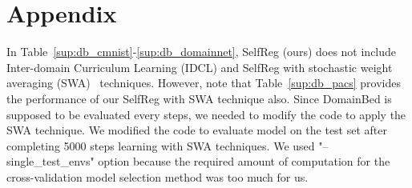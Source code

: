 \documentclass[10pt,twocolumn,letterpaper]{article}
\begin{document}
{


}
\newpage


\section*{Appendix}
In Table~\ref{sup:db_cmnist}-\ref{sup:db_domainnet}, SelfReg (ours) does not include Inter-domain Curriculum Learning (IDCL) and SelfReg with stochastic weight averaging (SWA)~\cite{izmailov2018averaging} techniques. However, note that Table~\ref{sup:db_pacs} provides the performance of our SelfReg with SWA technique also. Since DomainBed is supposed to be evaluated every  steps, we needed to modify the code to apply the SWA technique. We modified the code to evaluate model on the test set after completing 5000 steps learning with SWA techniques. We used "--single\_test\_envs" option because the required amount of computation for the cross-validation model selection method was too much for us.
\end{document}
